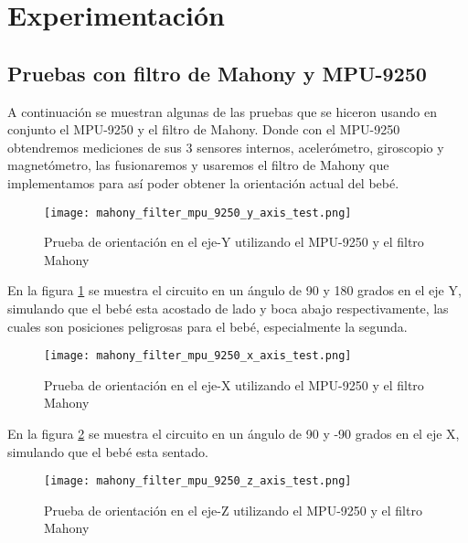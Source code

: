 



\section{Experimentación}
    \subsection{Pruebas con filtro de Mahony y MPU-9250}
       A continuación se muestran algunas de las pruebas que se hiceron usando en conjunto el 
       MPU-9250 y el filtro de Mahony. Donde con el MPU-9250 obtendremos mediciones de sus 3 sensores internos, acelerómetro, 
       giroscopio y magnetómetro, las fusionaremos y usaremos el filtro de Mahony que 
       implementamos para así poder obtener la orientación actual del bebé.

       \begin{figure}[htp!]
        \centering
             \texttt{[image: mahony\_filter\_mpu\_9250\_y\_axis\_test.png]}
              \caption{Prueba de orientación en el eje-Y utilizando el MPU-9250 y el filtro Mahony}
              \label{fig: test-y}
        \end{figure}
        \FloatBarrier 

        En la figura \ref{fig: test-y} se muestra el circuito en un ángulo de 90 y 180 grados en el eje Y, simulando que el bebé
        esta acostado de lado y boca abajo respectivamente, las cuales son posiciones peligrosas para el bebé, especialmente
        la segunda.

        \begin{figure}[htp!]
        \centering
            \texttt{[image: mahony\_filter\_mpu\_9250\_x\_axis\_test.png]}
            \caption{Prueba de orientación en el eje-X utilizando el MPU-9250 y el filtro Mahony}
            \label{fig: test-x}
        \end{figure}
        \FloatBarrier 
    
        En la figura \ref{fig: test-x} se muestra el circuito en un ángulo de 90 y -90 grados en el eje X, simulando que el bebé
        esta sentado.

        \begin{figure}[htp!]
        \centering
            \texttt{[image: mahony\_filter\_mpu\_9250\_z\_axis\_test.png]}
            \caption{Prueba de orientación en el eje-Z utilizando el MPU-9250 y el filtro Mahony}
            \label{fig: test-z}
        \end{figure}
        \FloatBarrier 

